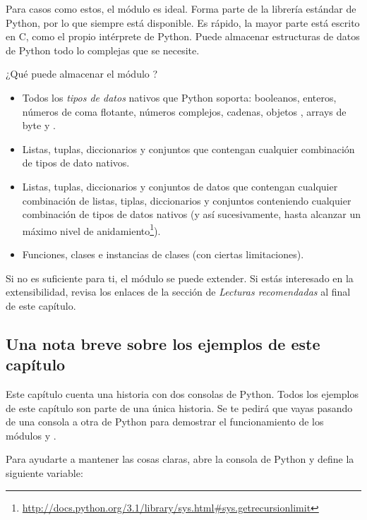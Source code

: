 Para casos como estos, el módulo  es ideal. Forma parte de la librería estándar de Python, por lo que siempre está disponible. Es rápido, la mayor parte está escrito en C, como el propio intérprete de Python. Puede almacenar estructuras de datos de Python todo lo complejas que se necesite.

¿Qué puede almacenar el módulo ?

\begin{itemize}

\item Todos los \emph{tipos de datos} nativos que Python soporta: booleanos, enteros, números de coma flotante, números complejos, cadenas, objetos , arrays de byte y .

\item Listas, tuplas, diccionarios y conjuntos que contengan cualquier combinación de tipos de dato nativos.

\item Listas, tuplas, diccionarios y conjuntos de datos que contengan cualquier combinación de listas, tiplas, diccionarios y conjuntos conteniendo cualquier combinación de tipos de datos nativos (y así sucesivamente, hasta alcanzar un máximo nivel de anidamiento\footnote{\href{http://docs.python.org/3.1/library/sys.html\#sys.getrecursionlimit}{http://docs.python.org/3.1/library/sys.html\#sys.getrecursionlimit}}).

\item Funciones, clases e instancias de clases (con ciertas limitaciones).

\end{itemize}

Si no es suficiente para ti, el módulo  se puede extender. Si estás interesado en la extensibilidad, revisa los enlaces de la sección de \emph{Lecturas recomendadas} al final de este capítulo.

\subsection{Una nota breve sobre los ejemplos de este capítulo}

Este capítulo cuenta una historia con dos consolas de Python. Todos los ejemplos de este capítulo son parte de una única historia. Se te pedirá que vayas pasando de una consola a otra de Python para demostrar el funcionamiento de los módulos  y .

Para ayudarte a mantener las cosas claras, abre la consola de Python y define la siguiente variable:

